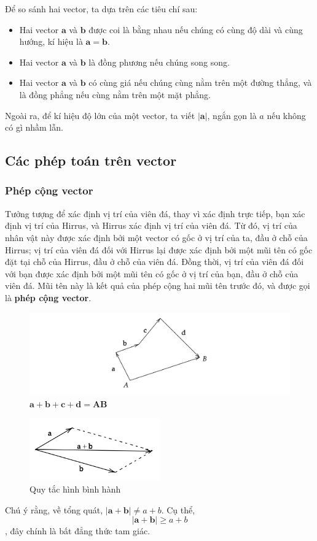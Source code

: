 Để so sánh hai vector, ta dựa trên các tiêu chí sau:
    \begin{itemize}
        \item Hai vector \(\mathbf{a}\) và \(\mathbf{b}\) được coi là bằng nhau nếu chúng có cùng độ dài và cùng hướng, kí hiệu là \(\mathbf{a}=\mathbf{b}\).
        \item Hai vector \(\mathbf{a}\) và \(\mathbf{b}\) là đồng phương nếu chúng song song.
        \item Hai vector \(\mathbf{a}\) và \(\mathbf{b}\) có cùng giá nếu chúng cùng nằm trên một đường thẳng, và là đồng phẳng nếu cùng nằm trên một mặt phẳng.
    \end{itemize}

Ngoài ra, để kí hiệu độ lớn của một vector, ta viết \(\lvert \mathbf{a}\rvert\), ngắn gọn là \(a\) nếu không có gì nhầm lẫn.  
\subsection{Các phép toán trên vector}

\subsubsection{Phép cộng vector}
Tưởng tượng để xác định vị trí của viên đá, thay vì xác định trực tiếp, bạn xác định vị trí của Hirrus, và Hirrus xác định vị trí của viên đá. Từ đó, vị trí của nhân vật này được xác định bởi một vector có gốc ở vị trí của ta, đầu ở chỗ của Hirrus; vị trí của viên đá đối với Hirrus lại được xác định bởi một mũi tên có gốc đặt tại chỗ của Hirrus, đầu ở chỗ của viên đá. Đồng thời, vị trí của viên đá đối với bạn được xác định bởi một mũi tên có gốc ở vị trí của bạn, đầu ở chỗ của viên đá. Mũi tên này là kết quả của phép cộng hai mũi tên trước đó, và được gọi là \textbf{phép cộng vector}.
\begin{figure}[H]
    \centering
    \includegraphics[width=1\textwidth]{Tuan2/Figures/congvector.png}
    \caption{$\mathbf{a}+\mathbf{b}+\mathbf{c}+\mathbf{d}=\mathbf{AB}$}
\end{figure}
\begin{figure}[H]
    \centering
    \includegraphics[width=0.5\textwidth]{Tuan2/Figures/quy_tac_hbh.png}
    \caption{Quy tắc hình bình hành}
\end{figure}
Chú ý rằng, về tổng quát, \(\lvert \mathbf{a}+\mathbf{b}\rvert\neq a+b\). Cụ thể, \[\lvert \mathbf{a}+\mathbf{b}\rvert \geq a+b\], đây chính là bất đẳng thức tam giác.
